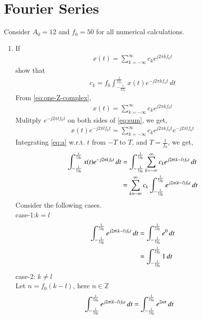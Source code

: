 \documentclass[journal,12pt,twocolumn]{IEEEtran}
\renewcommand\thesection{\arabic{section}}
\begin{document}
	\section{Fourier Series}
	Consider $A_0 =12$ and $f_0 = 50$ for all numerical calculations.
	\begin{enumerate}[label=\thesection.\arabic*,ref=\thesection.\theenumi]
		\item If
		\begin{align}
			x(t) = \sum_{k = -\infty}^{\infty}c_ke^{j2\pi kf_0 t}
			\label{eq:one-Z-complex}
		\end{align}
		show that 
		\begin{align}
			c_k = f_0\int_{-\frac{1}{2f_0}}^{\frac{1}{2f_0}}x(t)e^{-j2\pi kf_0 t}\, dt
			\label{eq:one-Z}
		\end{align}
		\solution 
		From \eqref{eq:one-Z-complex},
		\begin{align}
			\label{eq:sum}
			x(t) = \sum_{k = -\infty}^{\infty}c_ke^{j2\pi kf_0 t}
		\end{align}
		Mulitply $e^{-j2\pi lf_0 t}$ on both sides of \eqref{eq:sum}, we get,
		\begin{align}
			\label{eq:a}
			x(t)e^{-j2\pi lf_0 t}=\sum_{k = -\infty}^{\infty}c_ke^{j2\pi kf_0 t}e^{-j2\pi lf_0 t}
		\end{align}
		Integrating \eqref{eq:a} w.r.t. $t$ from $-T$ to $T$, and $T=\frac{1}{f_0}$, we get,\\
		\begin{align}
			\label{eq:d}
			\int_{-\frac{1}{2f_0}}^{\frac{1}{2f_0}}x(t)e^{-j2\pi kf_0 t}\, dt&=\int_{-\frac{1}{2f_0}}^{\frac{1}{2f_0}}\sum_{k = -\infty}^{\infty}c_ke^{j2\pi \left(k-l\right)f_0 t}\,dt\\
			&=\sum_{k = -\infty}^{\infty}c_k\int_{-\frac{1}{2f_0}}^{\frac{1}{2f_0}}e^{j2\pi \left(k-l\right)f_0 t}\,dt
		\end{align}
		Consider the following cases.\\
		case-1:$k=l$
		\begin{align}
			\int_{-\frac{1}{2f_0}}^{\frac{1}{2f_0}}e^{j2\pi \left(k-l\right)f_0 t}\,dt&=\int_{-\frac{1}{2f_0}}^{\frac{1}{2f_0}}e^{0}\,dt\\
			&=\int_{-\frac{1}{2f_0}}^{\frac{1}{2f_0}} 1 \,dt
		\end{align}
		case-2: $k \neq l$ \\
		Let $n=f_0(k-l)$, here $n \in \mathbb{Z}$
		\begin{align}
			\label{eq:b}
			\int_{-\frac{1}{2f_0}}^{\frac{1}{2f_0}}e^{j2\pi \brak{k-l}f_0 t}\,dt&=\int_{-\frac{1}{2f_0}}^{\frac{1}{2f_0}}e^{2n\pi}\,dt	

\end{align}
\end{enumerate}
\end{document}
